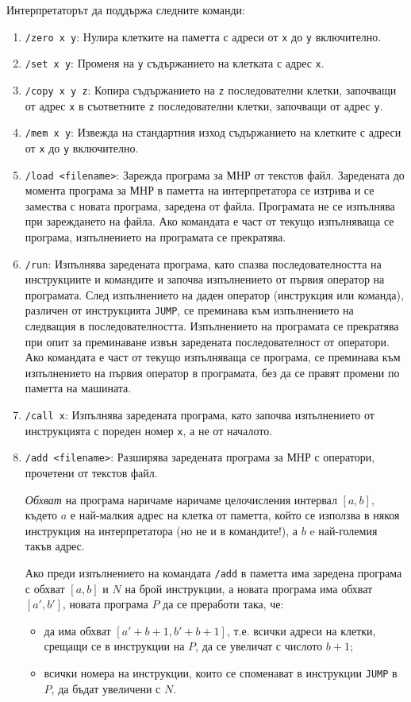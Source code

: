 \documentclass[12pt,a4paper]{article}
\newcommand{\code}[1]{\texttt{#1}}
\begin{document}
{Интерпретаторът да поддържа следните команди:

\begin{enumerate}
    \item \code{/zero x y}: Нулира клетките на паметта с адреси от \code{x} до \code{y} включително.
    \item \code{/set x y}: Променя на \code{y} съдържанието на клетката с адрес \code{x}.
    \item \code{/copy x y z}: Копира съдържанието на \code{z} последователни клетки, започващи от адрес \code{x} в съответните \code{z} последователни клетки, започващи от адрес \code{y}.
    \item \code{/mem x y}: Извежда на стандартния изход съдържанието на клетките с адреси от \code{x} до \code{y} включително.
    \item \code{/load <filename>}: Зарежда програма за МНР от текстов файл. Заредената до момента програма за МНР в паметта на интерпретатора се изтрива и се замества с новата програма, заредена от файла. Програмата не се изпълнява при зареждането на файла. Ако командата е част от текущо изпълняваща се програма, изпълнението на програмата се прекратява.
    \item \code{/run}: Изпълнява заредената програма, като спазва последователността на инструкциите и командите и започва изпълнението от първия оператор на програмата. След изпълнението на даден оператор (инструкция или команда), различен от инструкцията \code{JUMP}, се преминава към изпълнението на следващия в последователността. Изпълнението на програмата се прекратява при опит за преминаване извън заредената последователност от оператори. Ако командата е част от текущо изпълняваща се програма, се преминава към изпълнението на първия оператор в програмата, без да се правят промени по паметта на машината.
    \item \code{/call x}: Изпълнява заредената програма, като започва изпълнението от инструкцията с пореден номер \code{x}, а не от началото.
    \item \code{/add <filename>}: Разширява заредената програма за МНР с оператори, прочетени от текстов файл.

    \emph{Обхват} на програма наричаме наричаме целочисления интервал $[a,b]$, където $a$ е най-малкия адрес на клетка от паметта, който се използва в някоя инструкция на интерпретатора (но не и в командите!), а $b$ e най-големия такъв адрес.

    Ако преди изпълнението на командата \code{/add} в паметта има заредена програма с обхват $[a,b]$ и $N$ на брой инструкции, а новата програма има обхват $[a',b']$, новата програма $P$ да се преработи така, че:
    \begin{itemize}
    \item да има обхват $[a'+b+1,b'+b+1]$, т.е. всички адреси на клетки, срещащи се в инструкции на $P$, да се увеличат с числото $b+1$;
    \item всички номера на инструкции, които се споменават в инструкции \code{JUMP} в $P$, да бъдат увеличени с $N$.
    \end{itemize}


\end{enumerate}}
\end{document}
